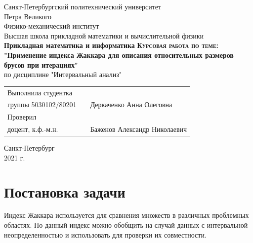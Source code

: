 \documentclass[12pt,a4paper]{article}
\begin{document}
    \begin{titlepage}
        \begin{center}
            \large
            Санкт-Петербургский политехнический университет\\Петра Великого\\
            \vspace{0.5cm}
            Физико-механический институт\\
            \vspace{0.25cm}
            Высшая школа прикладной математики и вычислительной физики\\
            \vspace{0.25cm}
            \textbf{Прикладная математика и информатика}
            \vfill
            \textsc{\LARGE\textbf{Курсовая работа по теме:
            }}\\[5mm]
            \Large
            \textbf{"Применение индекса Жаккара для описания относительных размеров брусов при итерациях"}\\
            \vspace{0.5cm}
            по дисциплине "Интервальный анализ"
        \end{center}
        \vfill
        \begin{tabular}{l p{} l}
            Выполнила студентка\\группы 5030102/80201 && Деркаченко Анна Олеговна
            \vspace{0.25cm}
            \\Проверил\\доцент, к.ф.-м.н. && Баженов Александр Николаевич
        \end{tabular}
        \vfill
        \begin{center}
            Санкт-Петербург\\2021 г.
        \end{center}
    \end{titlepage}

\newpage
\begin{center}
    \tableofcontents
    \setcounter{page}{2}
\end{center}
\newpage
\begin{center}
    \listoffigures
\end{center}

\newpage

\section{Постановка задачи}
Индекс Жаккара используется для сравнения множеств в различных проблемных областях. Но данный индекс можно обобщить на случай данных с интервальной неопределенностью и использовать для проверки их совместности.
\end{document}
